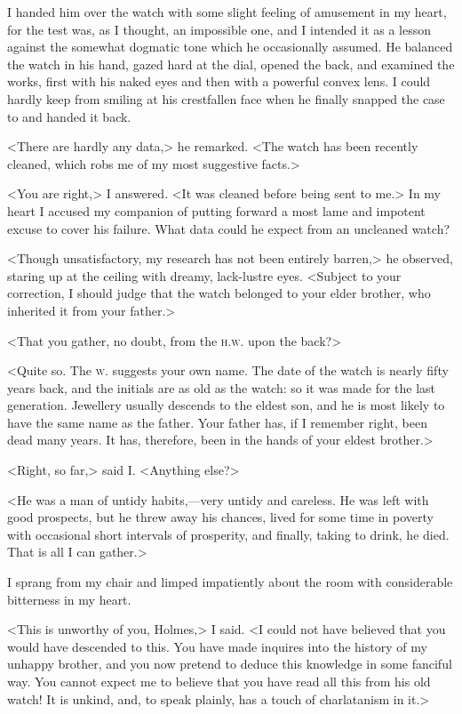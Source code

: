 I handed him over the watch with some slight feeling of amusement in my heart, for the test was, as I thought, an impossible one, and I intended it as a lesson against the somewhat dogmatic tone which he occasionally assumed. He balanced the watch in his hand, gazed hard at the dial, opened the back, and examined the works, first with his naked eyes and then with a powerful convex lens. I could hardly keep from smiling at his crestfallen face when he finally snapped the case to and handed it back.

<There are hardly any data,> he remarked. <The watch has been recently cleaned, which robs me of my most suggestive facts.>

<You are right,> I answered. <It was cleaned before being sent to me.> In my heart I accused my companion of putting forward a most lame and impotent excuse to cover his failure. What data could he expect from an uncleaned watch?

<Though unsatisfactory, my research has not been entirely barren,> he observed, staring up at the ceiling with dreamy, lack-lustre eyes. <Subject to your correction, I should judge that the watch belonged to your elder brother, who inherited it from your father.>

<That you gather, no doubt, from the \textsc{h.w.} upon the back?>

<Quite so. The \textsc{w.} suggests your own name. The date of the watch is nearly fifty years back, and the initials are as old as the watch: so it was made for the last generation. Jewellery usually descends to the eldest son, and he is most likely to have the same name as the father. Your father has, if I remember right, been dead many years. It has, therefore, been in the hands of your eldest brother.>

<Right, so far,> said I\@. <Anything else?>

<He was a man of untidy habits,—very untidy and careless. He was left with good prospects, but he threw away his chances, lived for some time in poverty with occasional short intervals of prosperity, and finally, taking to drink, he died. That is all I can gather.>

I sprang from my chair and limped impatiently about the room with considerable bitterness in my heart.

<This is unworthy of you, Holmes,> I said. <I could not have believed that you would have descended to this. You have made inquires into the history of my unhappy brother, and you now pretend to deduce this knowledge in some fanciful way. You cannot expect me to believe that you have read all this from his old watch! It is unkind, and, to speak plainly, has a touch of charlatanism in it.>

